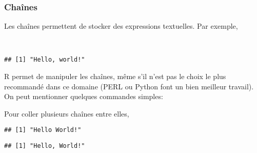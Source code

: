 \subsubsection{Chaînes}

Les chaînes permettent de stocker des expressions textuelles.
Par exemple,

\begin{knitrout}
\color{fgcolor}\begin{kframe}
\begin{flushleft}
\ttfamily\noindent
{}\hlassignement{\usebox{\hlnormalsizeboxlessthan}-}{\ }\hspace*{\fill}\\
\hlstd{}\mbox{}
\normalfont
\end{flushleft}
\begin{verbatim}
## [1] "Hello, world!"
\end{verbatim}
\end{kframe}
\end{knitrout}


R permet de manipuler les chaînes, même s'il n'est pas le choix le plus recommandé dans ce domaine (PERL ou Python font un bien meilleur travail).
On peut mentionner quelques commandes simples:

Pour coller plusieurs chaînes entre elles,

\begin{knitrout}
\color{fgcolor}\begin{kframe}
\begin{flushleft}
\ttfamily\noindent
{}\hlkeyword{(}\hlkeyword{,}{\ }\hlkeyword{)}\mbox{}
\normalfont
\end{flushleft}
\begin{verbatim}
## [1] "Hello World!"
\end{verbatim}
\begin{flushleft}
\ttfamily\noindent
{}\hlkeyword{(}\hlkeyword{,}{\ }\hlkeyword{,}{\ }\hlargument{=}{\ }\hlkeyword{)}\mbox{}
\normalfont
\end{flushleft}
\begin{verbatim}
## [1] "Hello, World!"
\end{verbatim}
\end{kframe}
\end{knitrout}


